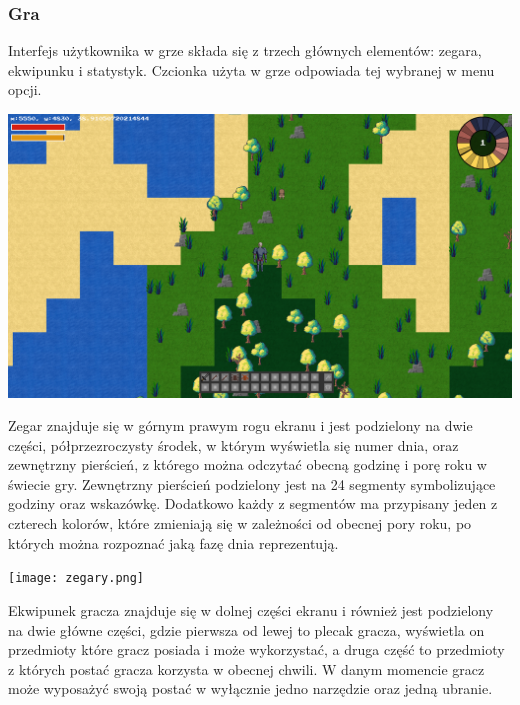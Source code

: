 \documentclass{article}
\begin{document}
\subsubsection{Gra}
Interfejs użytkownika w grze składa się z trzech głównych elementów: zegara, ekwipunku i statystyk.  Czcionka użyta w grze odpowiada tej wybranej w menu opcji.

\begin{center}
     \includegraphics[width=\textwidth]{gra.png}
\end{center}

Zegar znajduje się w górnym prawym rogu ekranu i jest podzielony na dwie części, półprzezroczysty środek, w którym wyświetla się numer dnia, oraz zewnętrzny pierścień, z którego można odczytać obecną godzinę i porę roku w świecie gry. Zewnętrzny pierścień podzielony jest na 24 segmenty symbolizujące godziny oraz wskazówkę. Dodatkowo każdy z segmentów ma przypisany jeden z czterech kolorów, które zmieniają się w zależności od obecnej pory roku, po których można rozpoznać jaką fazę dnia reprezentują.

\begin{center}
     \texttt{[image: zegary.png]}
\end{center}

\newpage

Ekwipunek gracza znajduje się w dolnej części ekranu i również jest podzielony na dwie główne części, gdzie pierwsza od lewej to plecak gracza, wyświetla on przedmioty które gracz posiada i może wykorzystać, a druga część to przedmioty z których postać gracza korzysta w obecnej chwili. W danym momencie gracz może wyposażyć swoją postać w wyłącznie jedno narzędzie oraz jedną ubranie.
\end{document}
